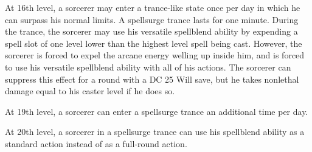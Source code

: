  At 16th level, a sorcerer may enter a trance-like state once per day in which he can surpass his normal limits. A spellsurge trance lasts for one minute. During the trance, the sorcerer may use his versatile spellblend ability by expending a spell slot of one level lower than the highest level spell being cast. However, the sorcerer is forced to expel the arcane energy welling up inside him, and is forced to use his versatile spellblend ability with all of his actions. The sorcerer can suppress this effect for a round with a DC 25 Will save, but he takes nonlethal damage equal to his caster level if he does so.

\par At 19th level, a sorcerer can enter a spellsurge trance an additional time per day.

 At 20th level, a sorcerer in a spellsurge trance can use his spellblend ability as a standard action instead of as a full-round action.

